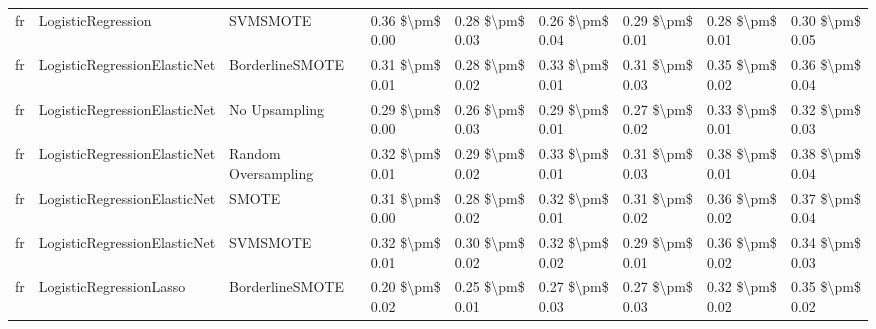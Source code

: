 \begin{tabular}{lllllllll}
      fr &              LogisticRegression &                      SVMSMOTE &     0.36 \$\textbackslash pm\$ 0.00 &           0.28 \$\textbackslash pm\$ 0.03 &       0.26 \$\textbackslash pm\$ 0.04 &        0.29 \$\textbackslash pm\$ 0.01 &                         0.28 \$\textbackslash pm\$ 0.01 &     0.30 \$\textbackslash pm\$ 0.05 \\
      fr &    LogisticRegressionElasticNet &               BorderlineSMOTE &     0.31 \$\textbackslash pm\$ 0.01 &           0.28 \$\textbackslash pm\$ 0.02 &       0.33 \$\textbackslash pm\$ 0.01 &        0.31 \$\textbackslash pm\$ 0.03 &                         0.35 \$\textbackslash pm\$ 0.02 &     0.36 \$\textbackslash pm\$ 0.04 \\
      fr &    LogisticRegressionElasticNet &                 No Upsampling &     0.29 \$\textbackslash pm\$ 0.00 &           0.26 \$\textbackslash pm\$ 0.03 &       0.29 \$\textbackslash pm\$ 0.01 &        0.27 \$\textbackslash pm\$ 0.02 &                         0.33 \$\textbackslash pm\$ 0.01 &     0.32 \$\textbackslash pm\$ 0.03 \\
      fr &    LogisticRegressionElasticNet &           Random Oversampling &     0.32 \$\textbackslash pm\$ 0.01 &           0.29 \$\textbackslash pm\$ 0.02 &       0.33 \$\textbackslash pm\$ 0.01 &        0.31 \$\textbackslash pm\$ 0.03 &                         0.38 \$\textbackslash pm\$ 0.01 &     0.38 \$\textbackslash pm\$ 0.04 \\
      fr &    LogisticRegressionElasticNet &                         SMOTE &     0.31 \$\textbackslash pm\$ 0.00 &           0.28 \$\textbackslash pm\$ 0.02 &       0.32 \$\textbackslash pm\$ 0.01 &        0.31 \$\textbackslash pm\$ 0.02 &                         0.36 \$\textbackslash pm\$ 0.02 &     0.37 \$\textbackslash pm\$ 0.04 \\
      fr &    LogisticRegressionElasticNet &                      SVMSMOTE &     0.32 \$\textbackslash pm\$ 0.01 &           0.30 \$\textbackslash pm\$ 0.02 &       0.32 \$\textbackslash pm\$ 0.02 &        0.29 \$\textbackslash pm\$ 0.01 &                         0.36 \$\textbackslash pm\$ 0.02 &     0.34 \$\textbackslash pm\$ 0.03 \\
      fr &         LogisticRegressionLasso &               BorderlineSMOTE &     0.20 \$\textbackslash pm\$ 0.02 &           0.25 \$\textbackslash pm\$ 0.01 &       0.27 \$\textbackslash pm\$ 0.03 &        0.27 \$\textbackslash pm\$ 0.03 &                         0.32 \$\textbackslash pm\$ 0.02 &     0.35 \$\textbackslash pm\$ 0.02 \\

\end{tabular}
